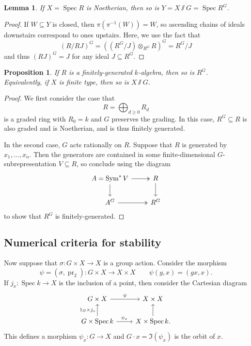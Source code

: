 \documentclass{amsart}
\newtheorem{prop}[thm]{Proposition}
\newtheorem{lem}[thm]{Lemma}
\theoremstyle{definition}
\theoremstyle{remark}
\theoremstyle{plain}
\theoremstyle{definition}
\theoremstyle{remark}
\newcommand{\on}[1]{\operatorname{#1}}
\newcommand{\1}{\mathbf{1}}
\newcommand{\2}{\mathbf{2}}
\newcommand{\3}{\mathbf{3}}
\DeclareMathOperator{\Spec}{Spec}
\begin{document}
\begin{lem}
    If \(X = \Spec R\) is Noetherian, then so is \(Y = X \sslash G = \Spec R^G\).
\end{lem}

\begin{proof}
    If \(W \subseteq Y\) is closed, then \(\pi(\pi^{-1}(W)) = W\), so ascending chains of ideals downstairs correspond to ones upstairs. Here, we use the fact that
    \[ (R/RJ)^G = ((R^G/J) \otimes_{R^G} R)^G = R^G/J \]
    and thus \((RJ)^G = J\) for any ideal \(J \subseteq R^G\).
\end{proof}

\begin{prop}
    If \(R\) is a finitely-generated \(k\)-algebra, then so is \(R^G\). Equivalently, if \(X\) is finite type, then so is \(X \sslash G\).
\end{prop}

\begin{proof}
    We first consider the case that 
    \[ R = \bigoplus_{d \geq 0} R_d \]
    is a graded ring with \(R_0 = k\) and \(G\) preserves the grading. In this case, \(R^G \subseteq R\) is also graded and is Noetherian, and is thus finitely generated.

    In the second case, \(G\) acts rationally on \(R\). Suppose that \(R\) is generated by \(x_1, \ldots, x_n\). Then the generators are contained in some finite-dimensional \(G\)-subrepresentation \(V \subseteq R\), so conclude using the diagram
    \begin{equation*}
    \begin{tikzcd}
        A = \on{Sym}^* V \ar{d} \ar[twoheadrightarrow]{r} & R \ar{d} \\
        A^G \ar[twoheadrightarrow]{r} & R^G
    \end{tikzcd}
    \end{equation*}
    to show that \(R^G\) is finitely-generated.
\end{proof}

\subsection{Numerical criteria for stability}%
\label{sub:Numerical criteria for stability}

Now suppose that \(\sigma \colon G \times X \to X\) is a group action. Consider the morphism
\[ \psi = (\sigma, \on{pr}_2) \colon G \times X \to X \times X \qquad \psi(g,x) = (gx,x). \]
If \(j_x \colon \Spec k \to X\) is the inclusion of a point, then consider the Cartesian diagram
\begin{equation*}
\begin{tikzcd}
    G \times X \ar{r}{\psi} & X \times X \\
    G \times \Spec k \ar{r}{\psi_x} \ar{u}{1_G \times j_x} & X \times \Spec k \ar{u}.
\end{tikzcd}
\end{equation*}
This defines a morphism \(\psi_x \colon G \to X\) and \(G \cdot x = \Im(\psi_x)\) is the orbit of \(x\).
\end{document}
